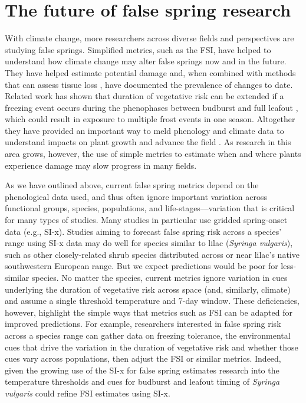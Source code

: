 \documentclass{article}\usepackage[]{graphicx}\usepackage[]{color}
\begin{document}
\section*{The future of false spring research}
With climate change, more researchers across diverse fields and perspectives are studying false springs. Simplified metrics, such as the FSI, have helped to understand how climate change may alter false springs now and in the future. They have helped estimate potential damage and, when combined with methods that can assess tissue loss \citep[e.g., PhenoCam images can capture initial greenup, defoliation due to frost or herbivory, then refoliation,][]{Richardson2018b}, have documented the prevalence of changes to date. Related work has shown that duration of vegetative risk can be extended if a freezing event occurs during the phenophases between budburst and full leafout \citep{Augspurger2009}, which could result in exposure to multiple frost events in one season. Altogether they have provided an important way to meld phenology and climate data to understand impacts on plant growth and advance the field \citep{Allstadt2015, Ault2015, Liu2018, Peterson2014}. As research in this area grows, however, the use of simple metrics to estimate when and where plants experience damage may slow progress in many fields. 

As we have outlined above, current false spring metrics depend on the phenological data used, and thus often ignore important variation across functional groups, species, populations, and life-stages---variation that is critical for many types of studies. Many studies in particular use gridded spring-onset data (e.g., SI-x). Studies aiming to forecast false spring risk across a species' range using SI-x data may do well for species similar to lilac (\emph{Syringa vulgaris}), such as other closely-related shrub species distributed across or near lilac's native southwestern European range. But we expect predictions would be poor for less-similar species. No matter the species, current metrics ignore variation in cues underlying the duration of vegetative risk across space (and, similarly, climate) and assume a single threshold temperature and 7-day window. These deficiencies, however, highlight the simple ways that metrics such as FSI can be adapted for improved predictions. For example, researchers interested in false spring risk across a species range can gather data on freezing tolerance, the environmental cues that drive the variation in the duration of vegetative risk and whether those cues vary across populations, then adjust the FSI or similar metrics. Indeed, given the growing use of the SI-x for false spring estimates research into the temperature thresholds and cues for budburst and leafout timing of \emph{Syringa vulgaris} could refine FSI estimates using SI-x. 
\end{document}
